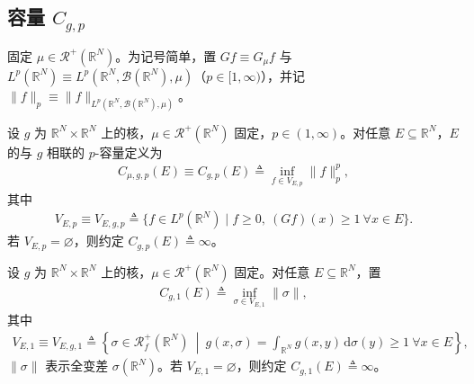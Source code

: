 \documentclass[../../main.tex]{subfiles}%
\begin{document}
\subsection{容量 $C_{g,p}$}\label{subsection:ch03-容量}

固定 $\mu\in\mathscr{R}^+(\mathbb{R}^N)$。为记号简单，置 $Gf\equiv G_\mu f$ 与 $L^p(\mathbb{R}^N)\equiv L^p(\mathbb{R}^N,\mathcal{B}(\mathbb{R}^N),\mu)$（$p\in[1,\infty)$），并记 $\|f\|_p\equiv\|f\|_{L^p(\mathbb{R}^N,\mathcal{B}(\mathbb{R}^N),\mu)}$。

\begin{definition}\label{definition:ch03-Cgp}
设 $g$ 为 $\mathbb{R}^N\times\mathbb{R}^N$ 上的核，$\mu\in\mathscr{R}^+(\mathbb{R}^N)$ 固定，$p\in(1,\infty)$。对任意 $E\subseteq\mathbb{R}^N$，$E$ 的与 $g$ 相联的 $p$-容量定义为
\begin{align}
C_{\mu,g,p}(E)\equiv C_{g,p}(E)\triangleq\inf_{f\in V_{E,p}}\|f\|_p^p,\label{align:ch03-3.25a}
\end{align}
其中
\begin{align}
V_{E,p}\equiv V_{E,g,p}\triangleq\{f\in L^p(\mathbb{R}^N)\mid f\geqslant0,\ (Gf)(x)\geqslant1\ \forall x\in E\}.\label{align:ch03-3.25b}
\end{align}
若 $V_{E,p}=\varnothing$，则约定 $C_{g,p}(E)\triangleq\infty$。
\end{definition}

\begin{definition}\label{definition:ch03-Cg1}
设 $g$ 为 $\mathbb{R}^N\times\mathbb{R}^N$ 上的核，$\mu\in\mathscr{R}^+(\mathbb{R}^N)$ 固定。对任意 $E\subseteq\mathbb{R}^N$，置
\begin{align}
C_{g,1}(E)\triangleq\inf_{\sigma\in V_{E,1}}\|\sigma\|,\label{align:ch03-3.26a}
\end{align}
其中
\begin{align}
V_{E,1}\equiv V_{E,g,1}\triangleq\left\{\sigma\in\mathscr{R}^+_f(\mathbb{R}^N)\ \middle|\ g(x,\sigma)=\int_{\mathbb{R}^N}g(x,y)\,\mathrm{d}\sigma(y)\geqslant1\ \forall x\in E\right\},\label{align:ch03-3.26b}
\end{align}
$\|\sigma\|$ 表示全变差 $\sigma(\mathbb{R}^N)$。若 $V_{E,1}=\varnothing$，则约定 $C_{g,1}(E)\triangleq\infty$。
\end{definition}
\end{document}
